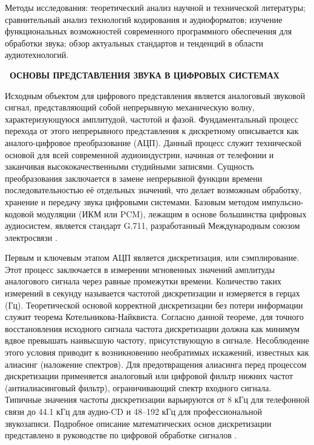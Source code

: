 \documentclass{SibFU-docs}
\begin{document}
Методы исследования: теоретический анализ научной и технической литературы; сравнительный анализ технологий кодирования и аудиоформатов; изучение функциональных возможностей современного программного обеспечения для обработки звука; обзор актуальных стандартов и тенденций в области аудиотехнологий.

\newpage
\vspace*{-2.5em}
\begin{center}\textbf{\thesection\ ОСНОВЫ ПРЕДСТАВЛЕНИЯ ЗВУКА В ЦИФРОВЫХ СИСТЕМАХ}\end{center}
\vspace*{-1.5em}

Исходным объектом для цифрового представления является аналоговый звуковой сигнал, представляющий собой непрерывную механическую волну, характеризующуюся амплитудой, частотой и фазой. Фундаментальный процесс перехода от этого непрерывного представления к дискретному описывается как аналого-цифровое преобразование (АЦП). Данный процесс служит технической основой для всей современной аудиоиндустрии, начиная от телефонии и заканчивая высококачественными студийными записями. Сущность преобразования заключается в замене непрерывной функции времени последовательностью её отдельных значений, что делает возможным обработку, хранение и передачу звука цифровыми системами. Базовым методом импульсно-кодовой модуляции (ИКМ или PCM), лежащим в основе большинства цифровых аудиосистем, является стандарт G.711, разработанный Международным союзом электросвязи \cite{itu2021}.


Первым и ключевым этапом АЦП является дискретизация, или сэмплирование. Этот процесс заключается в измерении мгновенных значений амплитуды аналогового сигнала через равные промежутки времени. Количество таких измерений в секунду называется частотой дискретизации и измеряется в герцах (Гц). Теоретической основой корректной дискретизации без потери информации служит теорема Котельникова-Найквиста. Согласно данной теореме, для точного восстановления исходного сигнала частота дискретизации должна как минимум вдвое превышать наивысшую частоту, присутствующую в сигнале. Несоблюдение этого условия приводит к возникновению необратимых искажений, известных как алиасинг (наложение спектров). Для предотвращения алиасинга перед процессом дискретизации применяется аналоговый или цифровой фильтр нижних частот (антиалиасинговый фильтр), ограничивающий спектр входного сигнала. Типичные значения частоты дискретизации варьируются от 8 кГц для телефонной связи до 44.1 кГц для аудио-CD и 48–192 кГц для профессиональной звукозаписи. Подробное описание математических основ дискретизации представлено в руководстве по цифровой обработке сигналов \cite{smith1997dsp}.
\end{document}
